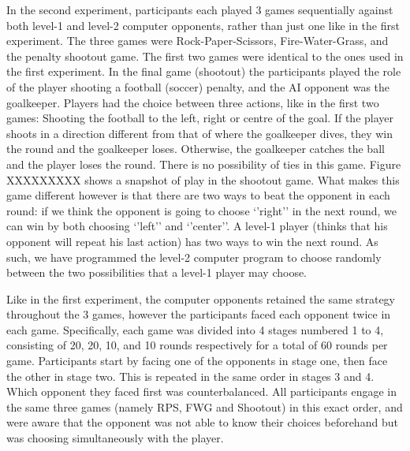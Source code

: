 \documentclass[man,floatsintext]{apa6}
\begin{document}
In the second experiment, participants each played 3 games sequentially against both level-1 and level-2 computer opponents, rather than just one like in the first experiment. The three games were Rock-Paper-Scissors, Fire-Water-Grass, and the penalty shootout game. The first two games were identical to the ones used in the first experiment. In the final game (shootout) the participants played the role of the player shooting a football (soccer) penalty, and the AI opponent was the goalkeeper. Players had the choice between three actions, like in the first two games: Shooting the football to the left, right or centre of the goal. If the player shoots in a direction different from that of where the goalkeeper dives, they win the round and the goalkeeper loses. Otherwise, the goalkeeper catches the ball and the player loses the round. There is no possibility of ties in this game. Figure XXXXXXXXX shows a snapshot of play in the shootout game. What makes this game different however is that there are two ways to beat the opponent in each round: if we think the opponent is going to choose `'right'' in the next round, we can win by both choosing `'left'' and `'center''. A level-1 player (thinks that his opponent will repeat his last action) has two ways to win the next round. As such, we have programmed the level-2 computer program to choose randomly between the two possibilities that a level-1 player may choose.

Like in the first experiment, the computer opponents retained the same strategy throughout the 3 games, however the participants faced each opponent twice in each game. Specifically, each game was divided into 4 stages numbered 1 to 4, consisting of 20, 20, 10, and 10 rounds respectively for a total of 60 rounds per game. Participants start by facing one of the opponents in stage one, then face the other in stage two. This is repeated in the same order in stages 3 and 4. Which opponent they faced first was counterbalanced. All participants engage in the same three games (namely RPS, FWG and Shootout) in this exact order, and were aware that the opponent was not able to know their choices beforehand but was choosing simultaneously with the player.
\end{document}
